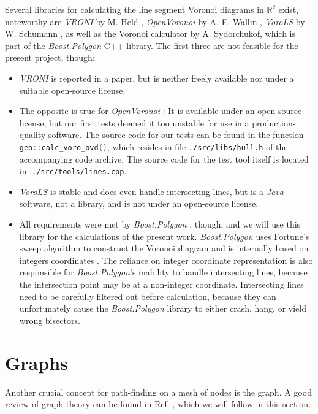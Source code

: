 Several libraries for calculating the line segment Voronoi diagrams in $\mathbb{R}^2$ exist, noteworthy 
are \textit{VRONI} by M. Held \cite{Held2001}, \textit{OpenVoronoi} by A. E. Wallin \cite{web_openvoronoi}, \textit{VoroLS} 
by W. Schumann \cite{DiplomaSchumann}, as well as the Voronoi calculator \cite{web_boost_polygon_voronoi} 
by A. Sydorchukof, which is part of the \textit{Boost.Polygon}  \cite{web_boost_polygon, Simonson2009} 
C++ library.
The first three are not feasible for the present project, though: 
\begin{itemize}
	\item \textit{VRONI} \cite{Held2001} is reported in a paper, but is neither freely available 
		nor under a suitable open-source license.
	\item The opposite is true for \textit{OpenVoronoi} \cite{web_openvoronoi}: 
		It is available under an open-source license, but our first tests deemed it too unstable 
		for use in a production-quality software. 
		The source code for our tests can be found in the function \lstinline[language=C++]|geo::calc_voro_ovd()|, 
		which resides in file \lstinline|./src/libs/hull.h| of the accompanying code archive. 
		The source code for the test tool itself is located in: \lstinline|./src/tools/lines.cpp|.
	\item \textit{VoroLS} \cite{DiplomaSchumann} is stable and does even handle intersecting lines, but is a \textit{Java}
		software, not a library, and is not under an open-source license.
	\item All requirements were met by \textit{Boost.Polygon} \cite{web_boost_polygon}, though, and we will use 
		this library for the calculations of the present work.
		\textit{Boost.Polygon}  uses Fortune's sweep algorithm \cite{Fortune1987} to construct 
		the Voronoi diagram and is internally based on integers coordinates \cite{web_boost_polygon}.
		The reliance on integer coordinate representation is also responsible for \textit{Boost.Polygon}'s 
		inability to handle intersecting lines, because the intersection point may be at a non-integer coordinate. 
		Intersecting lines need to be carefully filtered out before calculation, because they can unfortunately cause the 
		\textit{Boost.Polygon} library to either crash, hang, or yield wrong bisectors.
\end{itemize}




\section{Graphs}
\label{sec:graphs}
Another crucial concept for path-finding on a mesh of nodes is the graph.
A good review of graph theory can be found in Ref. \cite{FUH_algo_graphs_2021},
which we will follow in this section.

